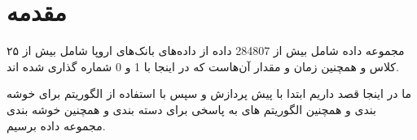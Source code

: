 \chapter{مقدمه}

مجموعه داده شامل بیش از 284807 داده از داده‌‌های بانک‌های اروپا شامل بیش از ۲۵ کلاس و همچنین زمان و مقدار آن‌هاست که در اینجا با 1 و 0 شماره گذاری شده اند.

ما در اینجا قصد داریم ابتدا با پیش پردازش و سپس با استفاده از الگوریتم  برای خوشه بندی و همچنین الگوریتم های  
به پاسخی برای دسته بندی و همچنین خوشه بندی مجموعه داده برسیم.	
